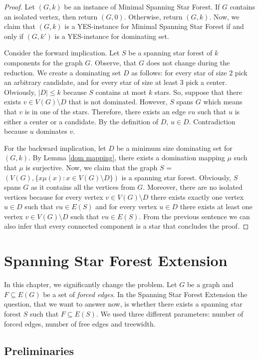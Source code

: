 \documentclass[en]{pracamgr}
\newcommand{\ssf}{spanning star forest}
\newcommand{\mssfp}{{\sc Minimal Spanning Star Forest}}
\newcommand{\ssfep}{{\sc Spanning Star Forest Extension}}
\newcommand{\domset}{dominating set}
\begin{document}
\begin{proof}
	Let $(G,k)$ be an instance of \mssfp{}. If $G$ contains an isolated vertex, then return $(G,0)$. Otherwise, return $(G,k)$. Now, we claim that $(G,k)$ is a YES-instance for \mssfp{} if and only if $(G,k')$ is a YES-instance for \domset.
	
	Consider the forward implication. Let $S$ be a spanning star forest of $k$ components for the graph $G$. Observe, that $G$ does not change during the reduction. We create a dominating set $D$ as follows: for every star of size $2$ pick an arbitrary candidate, and for every star of size at least $3$ pick a center. Obviously, $|D| \leq k$ because $S$ contains at most $k$ stars. So, suppose that there exists $v \in V(G) \setminus D$ that is not dominated. However, $S$ spans $G$ which means that $v$ is in one of the stars. Therefore, there exists an edge $vu$ such that $u$ is either a center or a candidate. By the definition of $D$, $u \in D$. Contradiction because $u$ dominates $v$.
	
	For the backward implication, let $D$ be a minimum size dominating set for $(G,k)$. By Lemma \ref{dom mapping}, there exists a domination mapping $\mu$ such that $\mu$ is surjective. Now, we claim that the graph $S$ = $(V(G), \{x\mu(x): x \in V(G) \setminus D\})$ is a spanning star forest. Obviously, $S$ spans $G$ as it contains all the vertices from $G$. Moreover, there are no isolated vertices because for every vertex $v \in V(G) \setminus D$ there exists exactly one vertex $u \in D$ such that $vu \in E(S)$ and for every vertex $u \in D$ there exists at least one vertex $v \in V(G) \setminus D$ such that $vu \in E(S)$. From the previous sentence we can also infer that every connected component is a star that concludes the proof.
\end{proof}

\chapter{Spanning Star Forest Extension}

In this chapter, we significantly change the problem. Let $G$ be a graph and $F \subseteq E(G)$ be a set of \emph{forced edges}. In the \ssfep{} the question, that we want to answer now, is whether there exists a \ssf{} $S$ such that $F \subseteq E(S)$. We used three different parameters: number of forced edges, number of free edges and treewidth. 

\section{Preliminaries}
\end{document}
